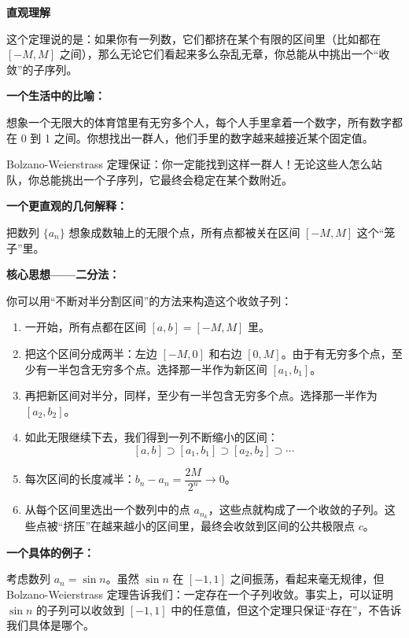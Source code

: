 \documentclass[fontset=fandol]{ctexart}
\newenvironment{custom}[1]{\par\noindent\textbf{#1}\quad}{\par\vspace{0.8em}}
\begin{document}
\begin{custom}{直观理解}

这个定理说的是：如果你有一列数，它们都挤在某个有限的区间里（比如都在 \([-M, M]\) 之间），那么无论它们看起来多么杂乱无章，你总能从中挑出一个“收敛”的子序列。

\textbf{一个生活中的比喻：}

想象一个无限大的体育馆里有无穷多个人，每个人手里拿着一个数字，所有数字都在 0 到 1 之间。你想找出一群人，他们手里的数字越来越接近某个固定值。

Bolzano-Weierstrass 定理保证：你一定能找到这样一群人！无论这些人怎么站队，你总能挑出一个子序列，它最终会稳定在某个数附近。

\textbf{一个更直观的几何解释：}

把数列 \(\{a_n\}\) 想象成数轴上的无限个点，所有点都被关在区间 \([-M, M]\) 这个“笼子”里。

\begin{center}
\end{center}

\textbf{核心思想——二分法：}

你可以用“不断对半分割区间”的方法来构造这个收敛子列：

\begin{enumerate}
\item 一开始，所有点都在区间 \([a, b] = [-M, M]\) 里。
\item 把这个区间分成两半：左边 \([-M, 0]\) 和右边 \([0, M]\)。由于有无穷多个点，至少有一半包含无穷多个点。选择那一半作为新区间 \([a_1, b_1]\)。
\item 再把新区间对半分，同样，至少有一半包含无穷多个点。选择那一半作为 \([a_2, b_2]\)。
\item 如此无限继续下去，我们得到一列不断缩小的区间：
\[
[a, b] \supset [a_1, b_1] \supset [a_2, b_2] \supset \cdots
\]
\item 每次区间的长度减半：\(b_n - a_n = \dfrac{2M}{2^n} \to 0\)。
\item 从每个区间里选出一个数列中的点 \(a_{n_k}\)，这些点就构成了一个收敛的子列。这些点被“挤压”在越来越小的区间里，最终会收敛到区间的公共极限点 \(c\)。
\end{enumerate}

\textbf{一个具体的例子：}

考虑数列 \(a_n = \sin n\)。虽然 \(\sin n\) 在 \([-1, 1]\) 之间振荡，看起来毫无规律，但 Bolzano-Weierstrass 定理告诉我们：一定存在一个子列收敛。事实上，可以证明 \(\sin n\) 的子列可以收敛到 \([-1, 1]\) 中的任意值，但这个定理只保证“存在”，不告诉我们具体是哪个。

\end{custom}
\end{document}
